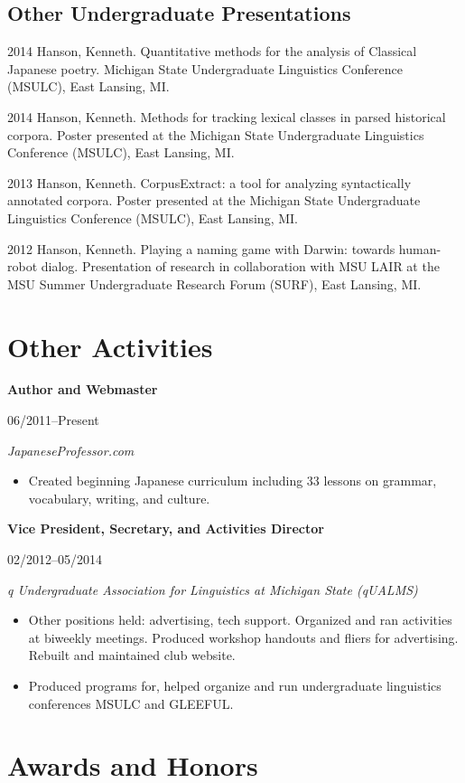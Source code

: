 \documentclass[10pt,oneside]{article}
\newcommand{\ressection}[1]{
	\vspace{-12pt}
	\section*{#1}
}
\newcommand{\ressubsection}[1]{
	\subsection*{#1}
	\vspace{-4pt}
}
\newcommand{\resbigitem}[4]{
	\item \parbox[t]{0.8\textwidth}{\textbf{#1}} \hfill #2 \\
		\parbox[t]{0.8\textwidth}{\textit{#3}} \hfill \textit{#4}
}
\begin{document}
\ressubsection{Other Undergraduate Presentations}
\begin{publist}
	\item[2014] {Hanson, Kenneth. Quantitative methods for the analysis of Classical Japanese poetry. Michigan State Undergraduate Linguistics Conference (MSULC), East Lansing, MI.}
	
	\item[2014] {Hanson, Kenneth. Methods for tracking lexical classes in parsed historical corpora. Poster presented at the Michigan State Undergraduate Linguistics Conference (MSULC), East Lansing, MI.}
	
	\item[2013] {Hanson, Kenneth. CorpusExtract: a tool for analyzing syntactically annotated corpora. Poster presented at the Michigan State Undergraduate Linguistics Conference (MSULC), East Lansing, MI.}
	
	\item[2012] {Hanson, Kenneth. Playing a naming game with Darwin: towards human-robot dialog. Presentation of research in collaboration with MSU LAIR at the MSU Summer Undergraduate Research Forum (SURF), East Lansing, MI.}
\end{publist}


\ressection{Other Activities}

\begin{reslist}
	\resbigitem{Author and Webmaster}
		{06/2011--Present}
		{JapaneseProfessor.com}
		{}
	\begin{itemize}
		\item Created beginning Japanese curriculum including 33 lessons on grammar, vocabulary, writing, and culture.
	\end{itemize}
	
	\resbigitem{Vice President, Secretary, and Activities Director}
		{02/2012--05/2014}
		{q Undergraduate Association for Linguistics at Michigan State (qUALMS)}
		{}
	\begin{itemize}
		\item Other positions held: advertising, tech support. Organized and ran activities at biweekly meetings. Produced workshop handouts and fliers for advertising. Rebuilt and maintained club website.
		\item Produced programs for, helped organize and run undergraduate linguistics conferences MSULC and GLEEFUL. 
	\end{itemize}
\end{reslist}


\ressection{Awards and Honors}
	
\end{document}
